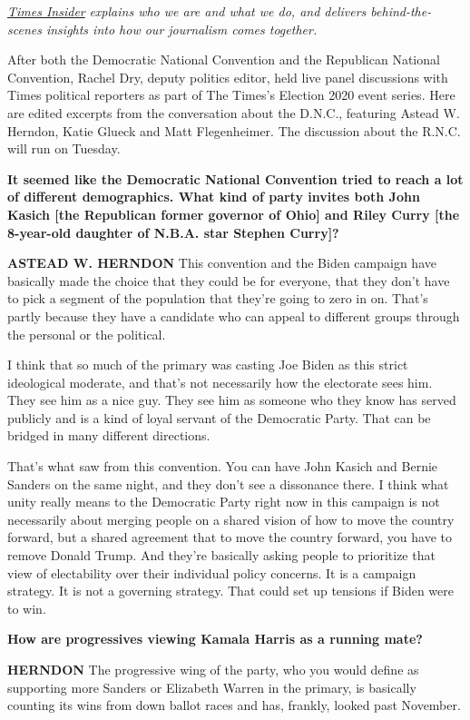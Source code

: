 \href{https://www.nytimes3xbfgragh.onion/series/times-insider}{\emph{Times
Insider}} \emph{explains who we are and what we do, and delivers
behind-the-scenes insights into how our journalism comes together.}

After both the Democratic National Convention and the Republican
National Convention, Rachel Dry, deputy politics editor, held live panel
discussions with Times political reporters as part of The Times's
Election 2020 event series. Here are edited excerpts from the
conversation about the D.N.C., featuring Astead W. Herndon, Katie Glueck
and Matt Flegenheimer. The discussion about the R.N.C. will run on
Tuesday.

\textbf{It seemed like the Democratic National Convention tried to reach
a lot of different demographics. What kind of party invites both John
Kasich {[}the Republican former governor of Ohio{]} and Riley Curry
{[}the 8-year-old daughter of N.B.A. star Stephen Curry{]}?}

\textbf{ASTEAD W. HERNDON} This convention and the Biden campaign have
basically made the choice that they could be for everyone, that they
don't have to pick a segment of the population that they're going to
zero in on. That's partly because they have a candidate who can appeal
to different groups through the personal or the political.

I think that so much of the primary was casting Joe Biden as this strict
ideological moderate, and that's not necessarily how the electorate sees
him. They see him as a nice guy. They see him as someone who they know
has served publicly and is a kind of loyal servant of the Democratic
Party. That can be bridged in many different directions.

That's what saw from this convention. You can have John Kasich and
Bernie Sanders on the same night, and they don't see a dissonance there.
I think what unity really means to the Democratic Party right now in
this campaign is not necessarily about merging people on a shared vision
of how to move the country forward, but a shared agreement that to move
the country forward, you have to remove Donald Trump. And they're
basically asking people to prioritize that view of electability over
their individual policy concerns. It is a campaign strategy. It is not a
governing strategy. That could set up tensions if Biden were to win.

\textbf{How are progressives viewing Kamala Harris as a running mate?}

\textbf{HERNDON} The progressive wing of the party, who you would define
as supporting more Sanders or Elizabeth Warren in the primary, is
basically counting its wins from down ballot races and has, frankly,
looked past November.

